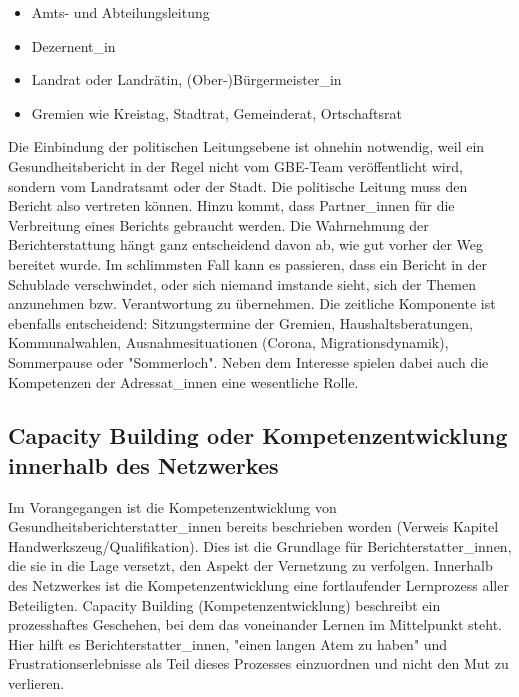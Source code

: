 \documentclass{article}
\begin{document}
\begin{itemize}
\item Amts- und Abteilungsleitung


\item Dezernent\_in 


\item Landrat oder Landrätin, (Ober-)Bürgermeister\_in


\item Gremien wie Kreistag, Stadtrat, Gemeinderat, Ortschaftsrat


\end{itemize}

Die Einbindung der politischen Leitungsebene ist ohnehin notwendig, weil ein Gesundheitsbericht in der Regel nicht vom GBE-Team veröffentlicht wird, sondern vom Landratsamt oder der Stadt. Die politische Leitung muss den Bericht also vertreten können. Hinzu kommt, dass Partner\_innen für die Verbreitung eines Berichts gebraucht werden. Die Wahrnehmung der Berichterstattung hängt ganz entscheidend davon ab, wie gut vorher der Weg bereitet wurde. Im schlimmsten Fall kann es passieren, dass ein Bericht in der Schublade verschwindet, oder sich niemand imstande sieht, sich der Themen anzunehmen bzw. Verantwortung zu übernehmen. Die zeitliche Komponente ist ebenfalls entscheidend: Sitzungstermine der Gremien, Haushaltsberatungen, Kommunalwahlen, Ausnahmesituationen (Corona, Migrationsdynamik), Sommerpause oder "Sommerloch". Neben dem Interesse spielen dabei auch die Kompetenzen der Adressat\_innen eine wesentliche Rolle.


\subsection{Capacity Building oder Kompetenzentwicklung innerhalb des Netzwerkes}\label{H3492218}



Im Vorangegangen ist die Kompetenzentwicklung von Gesundheitsberichterstatter\_innen bereits beschrieben worden (Verweis Kapitel Handwerkszeug/Qualifikation). Dies ist die Grundlage für Berichterstatter\_innen, die sie in die Lage versetzt, den Aspekt der Vernetzung zu verfolgen. Innerhalb des Netzwerkes ist die Kompetenzentwicklung eine fortlaufender Lernprozess aller Beteiligten. Capacity Building (Kompetenzentwicklung) beschreibt ein prozesshaftes Geschehen, bei dem das voneinander Lernen im Mittelpunkt steht. Hier hilft es Berichterstatter\_innen, "einen langen Atem zu haben" und Frustrationserlebnisse als Teil dieses Prozesses einzuordnen und nicht den Mut zu verlieren.
\end{document}
